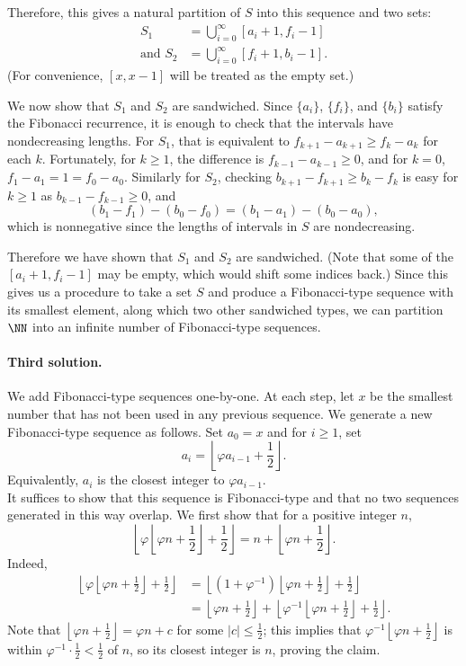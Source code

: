 \documentclass[11pt]{scrartcl}
\begin{document}
Therefore, this gives a natural partition of $S$ into this sequence and two sets: \begin{align*} S_1 &= \bigcup_{i=0}^{\infty} [a_i+1,f_i-1] \\ \text{and} \,\, S_2 &= \bigcup_{i=0}^{\infty} [f_i+1,b_i-1].\end{align*} (For convenience, $[x,x-1]$ will be treated as the empty set.)

We now show that $S_1$ and $S_2$ are sandwiched. Since $\{a_i\}$, $\{f_i\}$, and $\{b_i\}$ satisfy the Fibonacci recurrence, it is enough to check that the intervals have nondecreasing lengths. For $S_1$, that is equivalent to $f_{k+1} - a_{k+1} \ge f_k - a_k$ for each $k$. Fortunately, for $k \ge 1$, the difference is $f_{k-1} - a_{k-1} \ge 0$, and for $k = 0$, $f_1 - a_1 = 1 = f_0 - a_0$. Similarly for $S_2$, checking $b_{k+1} - f_{k+1} \ge b_k - f_k$ is easy for $k \ge 1$ as $b_{k-1} - f_{k-1} \ge 0$, and \[(b_{1} - f_1) - (b_0 - f_0) = (b_1 - a_1) - (b_0 - a_0),\] which is nonnegative since the lengths of intervals in $S$ are nondecreasing.

Therefore we have shown that $S_1$ and $S_2$ are sandwiched. (Note that some of the $[a_i+1,f_i-1]$ may be empty, which would shift some indices back.) Since this gives us a procedure to take a set $S$ and produce a Fibonacci-type sequence with its smallest element, along which two other sandwiched types, we can partition $\NN$ into an infinite number of Fibonacci-type sequences.

\paragraph{Third solution.} We add Fibonacci-type sequences one-by-one. At each step, let $x$ be the smallest number that has not been used in any previous sequence. We generate a new Fibonacci-type sequence as follows. Set $a_0 = x$ and for $i \ge 1$, set \[a_i = \left \lfloor \varphi a_{i-1} + \frac{1}{2} \right \rfloor.\] Equivalently, $a_{i}$ is the closest integer to $\varphi a_{i-1}$. \\
It suffices to show that this sequence is Fibonacci-type and that no two sequences generated in this way overlap.
We first show that for a positive integer $n$, \[\left \lfloor \varphi \left \lfloor \varphi n + \frac{1}{2} \right \rfloor + \frac{1}{2} \right \rfloor = n + \left \lfloor \varphi n + \frac{1}{2} \right \rfloor . \]
Indeed, \begin{align*} \left \lfloor \varphi \left \lfloor \varphi n + \frac{1}{2} \right \rfloor + \frac{1}{2} \right \rfloor &= \left \lfloor (1 + \varphi^{-1}) \left \lfloor \varphi n + \frac{1}{2} \right \rfloor + \frac{1}{2}\right \rfloor \\
&= \left \lfloor \varphi n + \frac{1}{2} \right \rfloor + \left \lfloor \varphi^{-1} \left \lfloor \varphi n + \frac{1}{2}\right \rfloor + \frac{1}{2} \right \rfloor.
\end{align*}
Note that $\left \lfloor \varphi n + \frac{1}{2} \right \rfloor = \varphi n + c$ for some $|c| \le \frac{1}{2}$; this implies that $\varphi^{-1}\left \lfloor \varphi n + \frac{1}{2} \right \rfloor$ is within $\varphi^{-1}\cdot \frac{1}{2} < \frac{1}{2}$ of $n$, so its closest integer is $n$, proving the claim.
\end{document}
